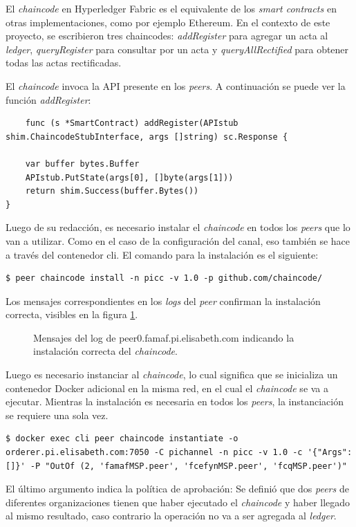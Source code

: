 \begin{enumerate}
El \textit{chaincode} en Hyperledger Fabric es el equivalente de los \textit{smart contracts} en otras implementaciones, como por ejemplo Ethereum. En el contexto de este proyecto, se escribieron tres chaincodes: \textit{addRegister} para agregar un acta al \textit{ledger}, \textit{queryRegister} para consultar por un acta y \textit{queryAllRectified} para obtener todas las actas rectificadas.

El \textit{chaincode} invoca la API presente en los \textit{peers}. A continuación se puede ver la función \textit{addRegister}: 
\begin{verbatim}
    func (s *SmartContract) addRegister(APIstub shim.ChaincodeStubInterface, args []string) sc.Response {

	var buffer bytes.Buffer
	APIstub.PutState(args[0], []byte(args[1]))
	return shim.Success(buffer.Bytes())
}
\end{verbatim}

Luego de su redacción, es necesario instalar el \textit{chaincode} en todos los \textit{peers} que lo van a utilizar. Como en el caso de la configuración del canal, eso también se hace a través del contenedor cli. El comando para la instalación es el siguiente:
\begin{verbatim}
$ peer chaincode install -n picc -v 1.0 -p github.com/chaincode/
\end{verbatim}
Los mensajes correspondientes en los \textit{logs} del \textit{peer} confirman la instalación correcta, visibles en la figura \ref{fig:chaincode_logs}.
\begin{figure}[H]
    \caption{Mensajes del log de peer0.famaf.pi.elisabeth.com indicando la instalación correcta del \textit{chaincode}.}
    \label{fig:chaincode_logs}
\end{figure}
Luego es necesario instanciar al \textit{chaincode}, lo cual significa que se inicializa un contenedor Docker adicional en la misma red, en el cual el \textit{chaincode} se va a ejecutar. Mientras la instalación es necesaria en todos los \textit{peers}, la instanciación se requiere una sola vez.
\begin{verbatim}
$ docker exec cli peer chaincode instantiate -o orderer.pi.elisabeth.com:7050 -C pichannel -n picc -v 1.0 -c '{"Args":[]}' -P "OutOf (2, 'famafMSP.peer', 'fcefynMSP.peer', 'fcqMSP.peer')"
\end{verbatim}
El último argumento indica la política de aprobación: Se definió que dos \textit{peers} de diferentes organizaciones tienen que haber ejecutado el \textit{chaincode} y haber llegado al mismo resultado, caso contrario la operación no va a ser agregada al \textit{ledger}.


\end{enumerate}
